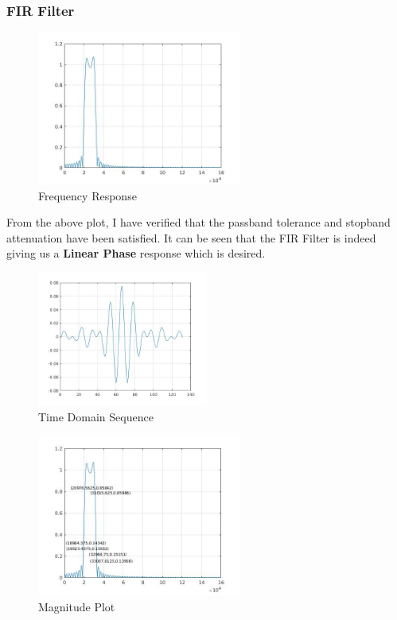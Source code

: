 \documentclass[12pt]{article}
\begin{document}
\subsubsection{FIR Filter}
\begin{figure}[h!]
	\centering	
	\includegraphics[width = 0.6\textwidth]{1firm.jpg}
    \caption{Frequency Response}
\end{figure}
From the above plot, I have verified that the passband tolerance and stopband attenuation have been satisfied. It can be seen that the FIR Filter is indeed giving us a \textbf{Linear Phase} response which is desired.
\begin{figure}[h!]
	\centering	
	\includegraphics[width = 0.5\textwidth]{1firc.jpg}
    \caption{Time Domain Sequence}
\end{figure}
\newpage
\begin{figure}[h!]
	\centering	
	\includegraphics[width = 0.6\textwidth]{1firb.jpg}
    \caption{Magnitude Plot}
\end{figure}
\end{document}
